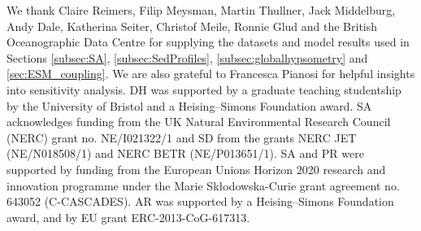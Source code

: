 \documentclass[gmd, manuscript]{copernicus}
\begin{document}
\begin{acknowledgements}
We thank Claire Reimers, Filip Meysman, Martin Thullner, Jack Middelburg, Andy Dale, Katherina Seiter, Christof Meile, Ronnie Glud and the British Oceanographic Data Centre for supplying the datasets and model results used in 
Sections \ref{subsec:SA}, \ref{subsec:SedProfiles},  \ref{subsec:globalhypsometry} and \ref{sec:ESM_coupling}. 
We are also grateful to Francesca Pianosi for helpful insights into sensitivity analysis. 
DH was supported by a graduate teaching studentship by the University of Bristol and a Heising–Simons Foundation award. SA acknowledges funding from the UK Natural Environmental Research Council (NERC) grant no. NE/I021322/1 and 
SD from the grants NERC JET (NE/N018508/1) and NERC BETR (NE/P013651/1). 
SA and PR were supported by funding from the European Unions Horizon 2020 research and innovation programme under the Marie Sk\l{}odowska-Curie grant agreement no. 643052 (C-CASCADES). 
AR was supported by a Heising–Simons Foundation award, and by EU grant ERC-2013-CoG-617313. 
\end{acknowledgements}

\pagebreak

\appendix
\end{document}
